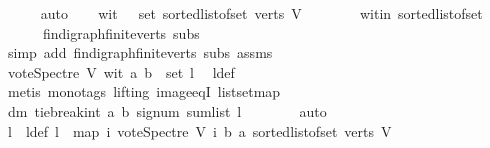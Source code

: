 \begin{isabellebody}
\ \ \ \ \isamarkupfalse%
\ auto\isanewline
\ \ \isamarkupfalse%
\ {\isachardoublequoteopen}wit\ {\isasymin}\ \ set\ {\isacharparenleft}{\kern0pt}sorted{\isacharunderscore}{\kern0pt}list{\isacharunderscore}{\kern0pt}of{\isacharunderscore}{\kern0pt}set\ {\isacharparenleft}{\kern0pt}verts\ V{\isacharparenright}{\kern0pt}{\isacharparenright}{\kern0pt}{\isachardoublequoteclose}\ \isanewline
\ \ \ \ \isamarkupfalse%
\ \ wit{\isacharunderscore}{\kern0pt}in\ sorted{\isacharunderscore}{\kern0pt}list{\isacharunderscore}{\kern0pt}of{\isacharunderscore}{\kern0pt}set{\isacharparenleft}{\kern0pt}{}{\isacharparenright}{\kern0pt}\ \isanewline
\ \ \ \ \ \ fin{\isacharunderscore}{\kern0pt}digraph{\isachardot}{\kern0pt}finite{\isacharunderscore}{\kern0pt}verts\ subs\isanewline
\ \ \ \ \isamarkupfalse%
\ {\isacharparenleft}{\kern0pt}simp\ add{\isacharcolon}{\kern0pt}\ fin{\isacharunderscore}{\kern0pt}digraph{\isachardot}{\kern0pt}finite{\isacharunderscore}{\kern0pt}verts\ subs\ assms{\isacharparenleft}{\kern0pt}{}{\isacharparenright}{\kern0pt}{\isacharparenright}{\kern0pt}\ \isanewline
\ \ \isamarkupfalse%
\ \isamarkupfalse%
\ {\isachardoublequoteopen}vote{\isacharunderscore}{\kern0pt}Spectre\ V\ wit\ a\ b\ {\isasymin}\ set\ l{\isachardoublequoteclose}\ \isamarkupfalse%
\ l{\isacharunderscore}{\kern0pt}def\isanewline
\ \ \ \ \isamarkupfalse%
\ {\isacharparenleft}{\kern0pt}metis\ {\isacharparenleft}{\kern0pt}mono{\isacharunderscore}{\kern0pt}tags{\isacharcomma}{\kern0pt}\ lifting{\isacharparenright}{\kern0pt}\ image{\isacharunderscore}{\kern0pt}eqI\ list{\isachardot}{\kern0pt}set{\isacharunderscore}{\kern0pt}map{\isacharparenright}{\kern0pt}\isanewline
\ \ \isamarkupfalse%
\ \isamarkupfalse%
\ dm{\isacharcolon}{\kern0pt}\ {\isachardoublequoteopen}tie{\isacharunderscore}{\kern0pt}break{\isacharunderscore}{\kern0pt}int\ a\ b\ {\isacharparenleft}{\kern0pt}signum\ {\isacharparenleft}{\kern0pt}sum{\isacharunderscore}{\kern0pt}list\ l{\isacharparenright}{\kern0pt}{\isacharparenright}{\kern0pt}\ {\isasymin}\ {\isacharbraceleft}{\kern0pt}{\isacharminus}{\kern0pt}{}{\isacharcomma}{\kern0pt}{}{\isacharbraceright}{\kern0pt}{\isachardoublequoteclose}\isanewline
\ \ \ \ \isamarkupfalse%
\ auto\ \ \isanewline
\ \ \isamarkupfalse%
\ l{}\ \ l{}{\isacharunderscore}{\kern0pt}def{\isacharcolon}{\kern0pt}\ {\isachardoublequoteopen}l{}\ {\isacharequal}{\kern0pt}\ {\isacharparenleft}{\kern0pt}map\ {\isacharparenleft}{\kern0pt}{\isasymlambda}i{\isachardot}{\kern0pt}\ vote{\isacharunderscore}{\kern0pt}Spectre\ V\ i\ b\ a{\isacharparenright}{\kern0pt}\ {\isacharparenleft}{\kern0pt}sorted{\isacharunderscore}{\kern0pt}list{\isacharunderscore}{\kern0pt}of{\isacharunderscore}{\kern0pt}set\ {\isacharparenleft}{\kern0pt}verts\ V{\isacharparenright}{\kern0pt}{\isacharparenright}{\kern0pt}{\isacharparenright}{\kern0pt}{\isachardoublequoteclose}\isanewline

\end{isabellebody}
